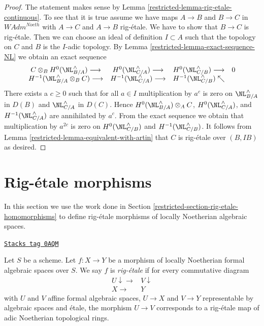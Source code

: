 \begin{proof}

The statement makes sense by
Lemma \ref{restricted-lemma-rig-etale-continuous}.
To see that it is true assume we have maps
$A \to B$ and $B \to C$ in $\textit{WAdm}^{Noeth}$
with $A \to C$ and $A \to B$ rig-\'etale.
We have to show that $B \to C$ is rig-\'etale.
Then we can choose an ideal of definition $I \subset A$
such that the topology on $C$ and $B$ is the $I$-adic topology.
By Lemma \ref{restricted-lemma-exact-sequence-NL} we obtain an exact sequence
$$
\begin{array}{cccc}C \otimes_B H^0(\NL_{B/A}^\wedge) \longrightarrow & H^0(\NL_{C/A}^\wedge) \longrightarrow & H^0(\NL_{C/B}^\wedge) \longrightarrow & 0 \\ H^{-1}(\NL_{B/A}^\wedge \otimes_B C) \longrightarrow & H^{-1}(\NL_{C/A}^\wedge) \longrightarrow & H^{-1}(\NL_{C/B}^\wedge) \nwarrow & \end{array}
$$
There exists a $c \geq 0$ such that for all $a \in I$
multiplication by $a^c$ is zero on $\NL_{B/A}^\wedge$ in $D(B)$ and
$\NL_{C/A}^\wedge$ in $D(C)$. Hence
$H^0(\NL_{B/A}^\wedge) \otimes_A C$,
$H^0(\NL_{C/A}^\wedge)$, and
$H^{-1}(\NL_{C/A}^\wedge)$
are annihilated by $a^c$. From the exact sequence
we obtain that multiplication by $a^{2c}$ is zero on
$H^0(\NL_{C/B}^\wedge)$ and $H^{-1}(\NL_{C/B}^\wedge)$.
It follows from Lemma \ref{restricted-lemma-equivalent-with-artin}
that $C$ is rig-\'etale over $(B, IB)$ as desired.
\end{proof}

\section{Rig-\'etale morphisms}
\label{restricted-section-rig-etale-morphisms}
In this section we use the work done in
Section \ref{restricted-section-rig-etale-homomorphisms}
to define rig-\'etale morphisms of locally Noetherian algebraic spaces.

\begin{definition}
\label{restricted-definition-rig-etale}
\href{https://stacks.math.columbia.edu/tag/0AQM}{\texttt{Stacks tag 0AQM}}

Let $S$ be a scheme. Let $f : X \to Y$ be a morphism of locally
Noetherian formal algebraic spaces over $S$. We say $f$ is
{\it rig-\'etale} if for every commutative diagram
$$
\begin{array}{cc}U \downarrow\longrightarrow & V \downarrow \\ X \longrightarrow & Y\end{array}
$$
with $U$ and $V$ affine formal algebraic spaces, $U \to X$ and $V \to Y$
representable by algebraic spaces and \'etale, the morphism $U \to V$
corresponds to a rig-\'etale map of adic Noetherian topological rings.
\end{definition}

